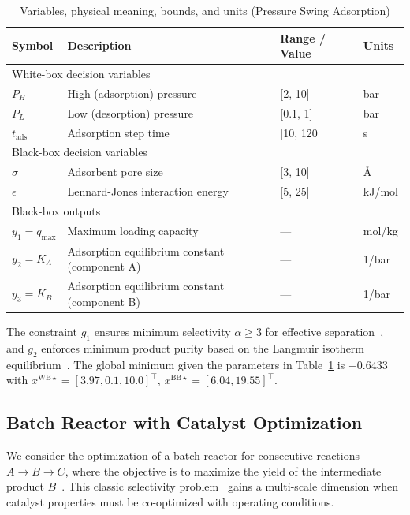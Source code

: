 \documentclass[12pt,a4paper]{article}%
\theoremstyle{plain}%
\theoremstyle{remark}%
\theoremstyle{definition}%
\def\WB{\mathrm{WB}}
\def\BB{\mathrm{BB}}
\begin{document}
\begin{appendices}
\begin{table}[htbp]
\centering
\caption{Variables, physical meaning, bounds, and units (Pressure Swing Adsorption)}
\label{tab:psa_vars}
\begin{tabular}{@{}llll@{}}
\toprule
\textbf{Symbol} & \textbf{Description} & \textbf{Range / Value} & \textbf{Units} \\
\midrule
\multicolumn{4}{l}{White-box decision variables} \\
\midrule
$P_H$ & High (adsorption) pressure & [2, 10] & bar \\
$P_L$ & Low (desorption) pressure & [0.1, 1] & bar \\
$t_{\text{ads}}$ & Adsorption step time & [10, 120] & s \\
\midrule
\multicolumn{4}{l}{Black-box decision variables} \\
\midrule
$\sigma$ & Adsorbent pore size & [3, 10] & \AA \\
$\epsilon$ & Lennard-Jones interaction energy & [5, 25] & kJ/mol \\
\midrule
\multicolumn{4}{l}{Black-box outputs} \\
\midrule
$y_1 = q_{\max}$ & Maximum loading capacity & --- & mol/kg \\
$y_2 = K_A$ & Adsorption equilibrium constant (component A) & --- & 1/bar \\
$y_3 = K_B$ & Adsorption equilibrium constant (component B) & --- & 1/bar \\
\bottomrule
\end{tabular}
\end{table}

The constraint $g_1$ ensures minimum selectivity $\alpha \geq 3$ for effective separation~\cite{hasan2013cost,yang1987gas}, and $g_2$ enforces minimum product purity based on the Langmuir isotherm equilibrium~\cite{langmuir1918adsorption,ruthven1994psa}. The global minimum given the parameters in Table~\ref{tab:psa_vars} is $-0.6433$ with $x^{\WB\star} = [3.97, 0.1, 10.0]^\top$, $x^{\BB\star} = [6.04, 19.55]^\top$.

\subsection{Batch Reactor with Catalyst Optimization}\label{subsec:app_batch_reactor}

We consider the optimization of a batch reactor for consecutive reactions $A \to B \to C$, where the objective is to maximize the yield of the intermediate product $B$~\cite{parulekar1988yield}. This classic selectivity problem~\cite{luus1999towards} gains a multi-scale dimension when catalyst properties must be co-optimized with operating conditions.


\end{appendices}
\end{document}
